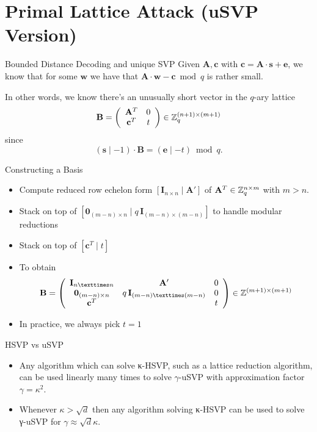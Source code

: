 \documentclass[presentation,smaller]{beamer}
\renewcommand{\vec}[1]{\mathbf{#1}\xspace}
\begin{document}
\section{Primal Lattice Attack (uSVP Version)}
\label{sec:org66bc059}
\begin{frame}[label={sec:org7ef9b6e}]{Bounded Distance Decoding and unique SVP}
Given \(\vec{A}, \vec{c}\) with \(\vec{c} = \vec{A} ⋅ \vec{s} + \vec{e}\), we know that for some \(\vec{w}\) we have that \(\vec{A}⋅\vec{w} - \vec{c} \bmod q\) is rather small.

In other words, we know there’s an unusually short vector in the \(q\)-ary lattice \[\vec{B}=\left(\begin{array}{cc}
          \vec{A}^T &  0 \\
          \vec{c}^T   & t \\
        \end{array} \right) \in \ZZ_q^{(n+1) \times (m+1)}\] since \[(\vec{s} \mid -1) ⋅ \vec{B} = (\vec{e} \mid -t) \bmod q.\]
\end{frame}

\begin{frame}[label={sec:orge41e655}]{Constructing a Basis}
\begin{itemize}
\item Compute reduced row echelon form \([\vec{I}_{n × n} \mid \vec{A}']\) of \(\vec{A}^T \in \ZZ_q^{n \times m}\) with \(m>n\).
\item Stack on top of \([\vec{0}_{(m-n) \times n} \mid q\,\vec{I}_{(m-n) × (m-n)}]\) to handle modular reductions
\item Stack on top of \([\vec{c}^T \mid t]\)
\item To obtain \[\vec{B}=\left(\begin{array}{ccc}
         \vec{I}_{n × n} & \vec{A}' &  0 \\
         \vec{0}_{(m-n) \times n} & q\,\vec{I}_{(m-n) × (m-n)} & 0\\
          \vec{c}^T  & & t \\
        \end{array} \right) \in \ZZ^{(m+1) \times (m+1)}\]
\item In practice, we always pick \(t=1\)
\end{itemize}
\end{frame}

\begin{frame}[label={sec:orgc96898b}]{HSVP vs uSVP}
\begin{itemize}
\item Any algorithm which can solve κ-HSVP, such as a lattice reduction algorithm, can be used linearly many times to solve \(γ\)-uSVP with approximation factor \(γ=κ^2\).
\item Whenever \(κ > \sqrt{d}\) then any algorithm solving κ-HSVP can be used to solve γ-uSVP for \(γ ≈ \sqrt{d} κ\).
\end{itemize}
\end{frame}
\end{document}
